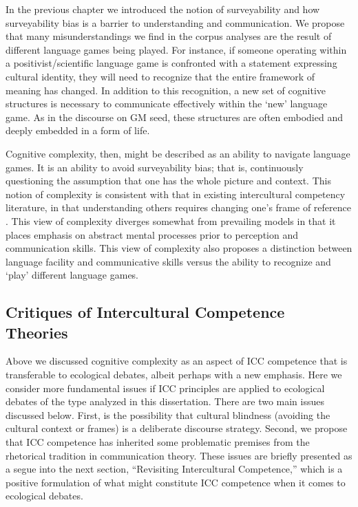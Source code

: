 In the previous chapter we introduced the notion of surveyability and how surveyability bias is a barrier to understanding and communication. We propose that many misunderstandings we find in the corpus analyses are the result of different language games being played. For instance, if someone operating within a positivist/scientific language game is confronted with a statement expressing cultural identity, they will need to recognize that the entire framework of meaning has changed. In addition to this recognition, a new set of cognitive structures is necessary to communicate effectively within the `new' language game. As in the discourse on GM seed, these structures are often embodied and deeply embedded in a form of life.      

Cognitive complexity, then, might be described as an ability to navigate language games. It is an ability to avoid surveyability bias; that is, continuously questioning the assumption that one has the whole picture and context. This notion of complexity is consistent with that in existing intercultural competency literature, in that understanding others requires changing one's frame of reference \citep{Friedman2014}. This view of complexity diverges somewhat from prevailing models in that it places emphasis on abstract mental processes prior to perception and communication skills. This view of complexity also proposes a distinction between language facility and communicative skills versus the ability to recognize and `play' different language games.     

\subsection{Critiques of Intercultural Competence Theories}

Above we discussed cognitive complexity as an aspect of ICC competence that is transferable to ecological debates, albeit perhaps with a new emphasis. Here we consider more fundamental issues if ICC principles are applied to ecological debates of the type analyzed in this dissertation. There are two main issues discussed below. First, is the possibility that cultural blindness (avoiding the cultural context or frames) is a deliberate discourse strategy. Second, we propose that ICC competence has inherited some problematic premises from the rhetorical tradition in communication theory. These issues are briefly presented as a segue into the next section, ``Revisiting Intercultural Competence,'' which is a positive formulation of what might constitute ICC competence when it comes to ecological debates.   

